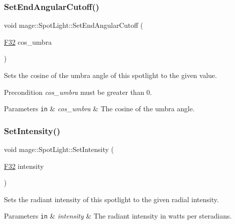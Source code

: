 \subsubsection{\texorpdfstring{Set\+End\+Angular\+Cutoff()}{SetEndAngularCutoff()}}
{\footnotesize\ttfamily void mage\+::\+Spot\+Light\+::\+Set\+End\+Angular\+Cutoff (\begin{DoxyParamCaption}\item[{\hyperlink{namespacemage_aa97e833b45f06d60a0a9c4fc22ae02c0}{F32}}]{cos\+\_\+umbra }\end{DoxyParamCaption})\hspace{0.3cm}{\ttfamily [noexcept]}}

Sets the cosine of the umbra angle of this spotlight to the given value.

\begin{DoxyPrecond}{Precondition}
{\itshape cos\+\_\+umbra} must be greater than 0. 
\end{DoxyPrecond}

\begin{DoxyParams}[1]{Parameters}
\mbox{\tt in}  & {\em cos\+\_\+umbra} & The cosine of the umbra angle. \\
\hline
\end{DoxyParams}
\hypertarget{classmage_1_1_spot_light_a947290df545ea2a8ef2b486898b92bd3}{}\label{classmage_1_1_spot_light_a947290df545ea2a8ef2b486898b92bd3} 
\subsubsection{\texorpdfstring{Set\+Intensity()}{SetIntensity()}}
{\footnotesize\ttfamily void mage\+::\+Spot\+Light\+::\+Set\+Intensity (\begin{DoxyParamCaption}\item[{\hyperlink{namespacemage_aa97e833b45f06d60a0a9c4fc22ae02c0}{F32}}]{intensity }\end{DoxyParamCaption})\hspace{0.3cm}{\ttfamily [noexcept]}}

Sets the radiant intensity of this spotlight to the given radial intensity.


\begin{DoxyParams}[1]{Parameters}
\mbox{\tt in}  & {\em intensity} & The radiant intensity in watts per steradians. \\
\hline
\end{DoxyParams}
\hypertarget{classmage_1_1_spot_light_a7510d29df641a651bab5f3d393e18b60}{}\label{classmage_1_1_spot_light_a7510d29df641a651bab5f3d393e18b60} 
